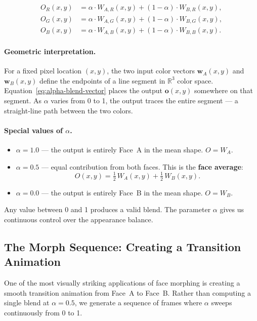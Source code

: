 \begin{align}
    O_R(x, y) &= \alpha \cdot W_{A,R}(x, y) + (1 - \alpha) \cdot W_{B,R}(x, y), \\
    O_G(x, y) &= \alpha \cdot W_{A,G}(x, y) + (1 - \alpha) \cdot W_{B,G}(x, y), \\
    O_B(x, y) &= \alpha \cdot W_{A,B}(x, y) + (1 - \alpha) \cdot W_{B,B}(x, y).
\end{align}

\paragraph{Geometric interpretation.} For a fixed pixel location $(x, y)$, the two input color
vectors $\mathbf{w}_A(x, y)$ and $\mathbf{w}_B(x, y)$ define the endpoints of a line segment in
$\mathbb{R}^3$ color space. Equation~\eqref{eq:alpha-blend-vector} places the output
$\mathbf{o}(x, y)$ somewhere on that segment. As $\alpha$ varies from 0 to 1, the output traces
the entire segment --- a straight-line path between the two colors.

\paragraph{Special values of $\alpha$.}

\begin{itemize}
    \item $\alpha = 1.0$ --- the output is entirely Face~A in the mean shape.
          $O = W_A$.
    \item $\alpha = 0.5$ --- equal contribution from both faces. This is the
          \textbf{face average}:
          \begin{equation}
              O(x, y) = \tfrac{1}{2}\, W_A(x, y) + \tfrac{1}{2}\, W_B(x, y).
          \end{equation}
    \item $\alpha = 0.0$ --- the output is entirely Face~B in the mean shape.
          $O = W_B$.
\end{itemize}

Any value between 0 and 1 produces a valid blend. The parameter $\alpha$ gives us continuous
control over the appearance balance.

\subsection{The Morph Sequence: Creating a Transition Animation}

One of the most visually striking applications of face morphing is creating a smooth transition
animation from Face~A to Face~B. Rather than computing a single blend at $\alpha = 0.5$, we
generate a sequence of frames where $\alpha$ sweeps continuously from 0 to 1.

